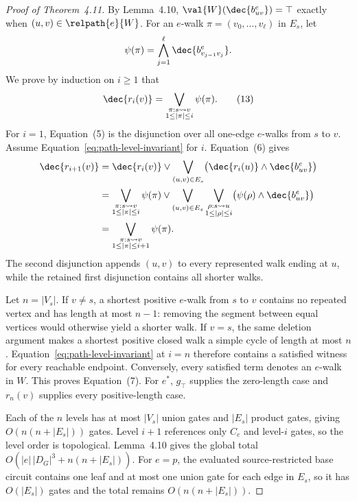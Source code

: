 \documentclass[sigconf, nonacm]{acmart}
\begin{document}
\begin{proof}[Proof of Theorem~4.11]
By Lemma~4.10, $\val{W}(\dec{b^e_{uv}})=\top$ exactly when $(u,v)\in\relpath{e}{W}$. For an $e$-walk $\pi=(v_0,\ldots,v_\ell)$ in $E_s$, let
\[
 \psi(\pi)=\bigwedge_{j=1}^{\ell}\dec{b^e_{v_{j-1}v_j}}.
\]
We prove by induction on $i\ge1$ that
\[
 \dec{r_i(v)}=
 \bigvee_{\substack{\pi:s\leadsto v\\1\le|\pi|\le i}}\psi(\pi).
 \tag{13}\label{eq:path-level-invariant}
\]
For $i=1$, Equation~(5) is the disjunction over all one-edge $e$-walks from $s$ to $v$. Assume Equation~\eqref{eq:path-level-invariant} for $i$. Equation~(6) gives
\begin{align*}
 \dec{r_{i+1}(v)}
 &=\dec{r_i(v)}\lor
 \bigvee_{(u,v)\in E_s}
 \bigl(\dec{r_i(u)}\land\dec{b^e_{uv}}\bigr)\\
 &=\bigvee_{\substack{\pi:s\leadsto v\\1\le|\pi|\le i}}\psi(\pi)
 \lor
 \bigvee_{(u,v)\in E_s}
 \bigvee_{\substack{\rho:s\leadsto u\\1\le|\rho|\le i}}
 \bigl(\psi(\rho)\land\dec{b^e_{uv}}\bigr)\\
 &=\bigvee_{\substack{\pi:s\leadsto v\\1\le|\pi|\le i+1}}\psi(\pi).
\end{align*}
The second disjunction appends $(u,v)$ to every represented walk ending at $u$, while the retained first disjunction contains all shorter walks.

Let $n=|V_s|$. If $v\ne s$, a shortest positive $e$-walk from $s$ to $v$ contains no repeated vertex and has length at most $n-1$: removing the segment between equal vertices would otherwise yield a shorter walk. If $v=s$, the same deletion argument makes a shortest positive closed walk a simple cycle of length at most $n$. Equation~\eqref{eq:path-level-invariant} at $i=n$ therefore contains a satisfied witness for every reachable endpoint. Conversely, every satisfied term denotes an $e$-walk in $W$. This proves Equation~(7). For $e^*$, $g_\top$ supplies the zero-length case and $r_n(v)$ supplies every positive-length case.

Each of the $n$ levels has at most $|V_s|$ union gates and $|E_s|$ product gates, giving $O(n(n+|E_s|))$ gates. Level $i+1$ references only $C_e$ and level-$i$ gates, so the level order is topological. Lemma~4.10 gives the global total $O(|e|\,|D_G|^3+n(n+|E_s|))$. For $e=p$, the evaluated source-restricted base circuit contains one leaf and at most one union gate for each edge in $E_s$, so it has $O(|E_s|)$ gates and the total remains $O(n(n+|E_s|))$.
\end{proof}
\end{document}
